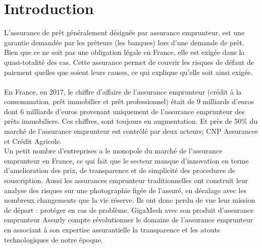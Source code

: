 \documentclass[
11pt, %
french, %
singlespacing, %
headsepline, %
]{MastersDoctoralThesis} %
\begin{document}
\chapter*{Introduction}
L’assurance de prêt généralement désignée par assurance emprunteur, est une garantie demandée par les prêteurs (les banques) lors d’une demande de prêt. 
Bien que ce ne soit pas une obligation légale en France, elle est exigée dans la quasi-totalité des cas. Cette assurance permet de couvrir les risques de défaut 
de paiement quelles que soient leurs causes, ce qui explique qu’elle soit ainsi exigée.\\ \\
En France, en  2017,  le  chiffre  d’affaire  de  l’assurance  emprunteur  (crédit  à  la consommation, prêt immobilier et prêt professionnel) était de 9 milliards d’euros dont 6  milliards  d’euros  provenant  uniquement  de  l’assurance  emprunteur  des  prêts immobiliers. Ces chiffres, sont toujours  en augmentation. Et près de 50\% du marché de l'assurance emprunteur est contrôlé par deux acteurs: CNP Assurances et   Crédit   Agricole.\\ 
Un petit nombre d'entreprises a le monopole du marché de l'assurance emprunteur en France, ce qui fait que le secteur manque d'innovation en terme d'amelioration des prix, de transparence et de simplicité des procedures de souscription. Aussi les assurances emprunteur traditionnelles ont construit leur analyse des risques sur une photographie figée de l’assuré, en décalage avec les nombreux changements que la vie réserve. Ils ont donc perdu de vue leur mission de départ : protéger en cas de problème. %
GigaMesh avec son produit d'assurance emprunteur Assurly compte  révolutionner le domaine de l'assurance emprunteur en associant à son expertise assurantielle  la transparence et les atouts technologiques de notre époque. \\ 
\end{document}
